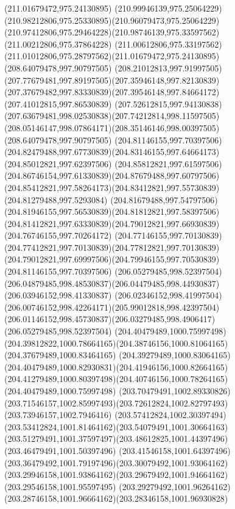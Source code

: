 {{		\moveto(211.01679472,975.24130895)
		\curveto(210.99946139,975.25064229)(210.98212806,975.25330895)(210.96079473,975.25064229)
		\curveto(210.97412806,975.29464228)(210.98746139,975.33597562)(211.00212806,975.37864228)
		\curveto(211.00612806,975.33197562)(211.01012806,975.28797562)(211.01679472,975.24130895)
		\moveto(208.64079478,997.90797505)
		\curveto(208.21012813,997.91997505)(207.77679481,997.89197505)(207.35946148,997.82130839)
		\curveto(207.37679482,997.83330839)(207.39546148,997.84664172)(207.41012815,997.86530839)
		\curveto(207.52612815,997.94130838)(207.63679481,998.02530838)(207.74212814,998.11597505)
		\curveto(208.05146147,998.07864171)(208.35146146,998.00397505)(208.64079478,997.90797505)
		\moveto(204.81146155,997.70397506)
		\curveto(204.82479488,997.67730839)(204.83146155,997.64664173)(204.85012821,997.62397506)
		\curveto(204.85812821,997.61597506)(204.86746154,997.61330839)(204.87679488,997.60797506)
		\curveto(204.85412821,997.58264173)(204.83412821,997.55730839)(204.81279488,997.5293084)
		\curveto(204.81679488,997.54797506)(204.81946155,997.56530839)(204.81812821,997.58397506)
		\curveto(204.81412821,997.63330839)(204.79012821,997.66930839)(204.76746155,997.70264172)
		\curveto(204.77146155,997.70130839)(204.77412821,997.70130839)(204.77812821,997.70130839)
		\curveto(204.79012821,997.69997506)(204.79946155,997.70530839)(204.81146155,997.70397506)
		\moveto(206.05279485,998.52397504)
		\curveto(206.04879485,998.48530837)(206.04479485,998.44930837)(206.03946152,998.41330837)
		\curveto(206.02346152,998.41997504)(206.00746152,998.42264171)(205.99012818,998.42397504)
		\curveto(206.01146152,998.45730837)(206.03279485,998.4906417)(206.05279485,998.52397504)
		\moveto(204.40479489,1000.75997498)
		\curveto(204.39812822,1000.78664165)(204.38746156,1000.81064165)(204.37679489,1000.83464165)
		\curveto(204.39279489,1000.83064165)(204.40479489,1000.82930831)(204.41946156,1000.82664165)
		\curveto(204.41279489,1000.80397498)(204.40746156,1000.78264165)(204.40479489,1000.75997498)
		\moveto(203.70479491,1002.89330826)
		\curveto(203.71546157,1002.85997493)(203.72612824,1002.82797493)(203.73946157,1002.7946416)
		\curveto(203.57412824,1002.30397494)(203.53412824,1001.81464162)(203.54079491,1001.30664163)
		\curveto(203.51279491,1001.37597497)(203.48612825,1001.44397496)(203.46479491,1001.50397496)
		\curveto(203.41546158,1001.64397496)(203.36479492,1001.79197496)(203.30079492,1001.93064162)
		\curveto(203.29946158,1001.93864162)(203.29679492,1001.94664162)(203.29546158,1001.95597495)
		\curveto(203.29279492,1001.96264162)(203.28746158,1001.96664162)(203.28346158,1001.96930828)
}}
